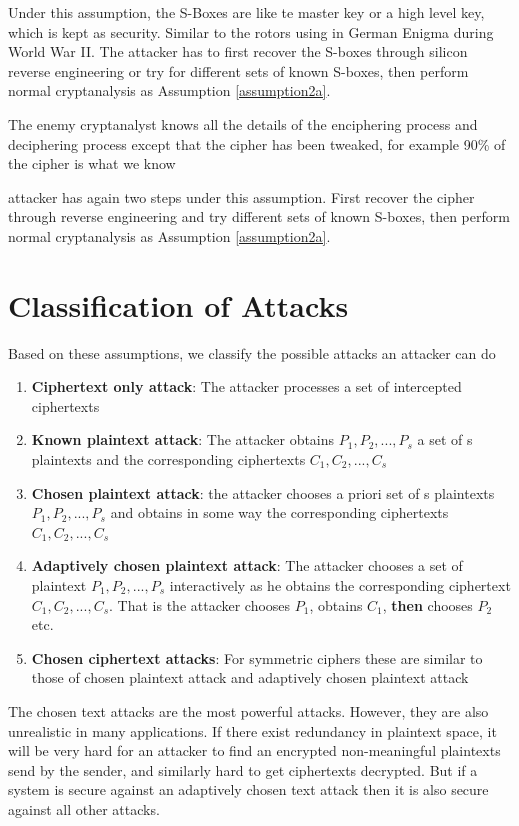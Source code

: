 Under this assumption, the S-Boxes are like te master key or a high level key, which is kept as security. Similar to the rotors using in German Enigma during World War II. The attacker has to first recover the S-boxes through silicon reverse engineering or try for different sets of known S-boxes, then perform normal cryptanalysis as Assumption \ref{assumption2a}.
\begin{myAssumption}
	The enemy cryptanalyst knows all the details of the enciphering process and deciphering process except that the cipher has been tweaked, for example 90\% of the cipher is what we know
\end{myAssumption}
attacker has again two steps under this assumption. First recover the cipher through reverse engineering and try different sets of known S-boxes, then perform normal cryptanalysis as Assumption \ref{assumption2a}.

\section{Classification of Attacks}
Based on these assumptions, we classify the possible attacks an attacker can do \cite{schneier1996applied}
\begin{enumerate}
	\item \textbf{Ciphertext only attack}: The attacker processes a set of intercepted ciphertexts
	\item \textbf{Known plaintext attack}: The attacker obtains $P_{1},P_{2},...,P_{s}$ a set of s plaintexts and the corresponding ciphertexts $C_{1},C_{2},...,C_{s}$
	\item \textbf{Chosen plaintext attack}: the attacker chooses a priori set of s plaintexts $P_{1},P_{2},...,P_{s}$ and obtains in some way the corresponding ciphertexts $C_{1},C_{2},...,C_{s}$
	\item \textbf{Adaptively chosen plaintext attack}: The attacker chooses a set of plaintext $P_{1},P_{2},...,P_{s}$ interactively as he obtains the corresponding ciphertext $C_{1},C_{2},...,C_{s}$. That is the attacker chooses $P_{1}$, obtains $C_{1}$, \textbf{then} chooses $P_{2}$ etc.
	\item \textbf{Chosen ciphertext attacks}: For symmetric ciphers these are similar to those of chosen plaintext attack and adaptively chosen plaintext attack
\end{enumerate}

The chosen text attacks are the most powerful attacks. However, they are also unrealistic in many applications. If there exist redundancy in plaintext space, it will be very hard for an attacker to find an encrypted non-meaningful plaintexts send by the sender, and similarly hard to get ciphertexts decrypted. But if a system is secure against an adaptively chosen text attack then it is also secure against all other attacks.


